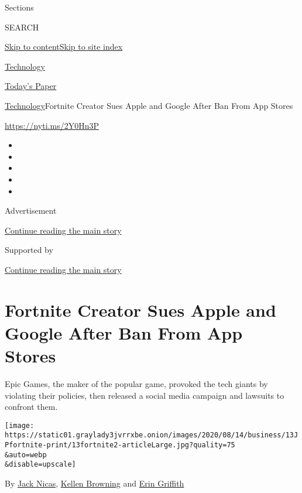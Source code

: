 Sections

SEARCH

\protect\hyperlink{site-content}{Skip to
content}\protect\hyperlink{site-index}{Skip to site index}

\href{https://www.nytimes3xbfgragh.onion/section/technology}{Technology}

\href{https://myaccount.nytimes3xbfgragh.onion/auth/login?response_type=cookie\&client_id=vi}{}

\href{https://www.nytimes3xbfgragh.onion/section/todayspaper}{Today's
Paper}

\href{/section/technology}{Technology}\textbar{}Fortnite Creator Sues
Apple and Google After Ban From App Stores

\url{https://nyti.ms/2Y0Hn3P}

\begin{itemize}
\item
\item
\item
\item
\item
\end{itemize}

Advertisement

\protect\hyperlink{after-top}{Continue reading the main story}

Supported by

\protect\hyperlink{after-sponsor}{Continue reading the main story}

\hypertarget{fortnite-creator-sues-apple-and-google-after-ban-from-app-stores}{%
\section{Fortnite Creator Sues Apple and Google After Ban From App
Stores}\label{fortnite-creator-sues-apple-and-google-after-ban-from-app-stores}}

Epic Games, the maker of the popular game, provoked the tech giants by
violating their policies, then released a social media campaign and
lawsuits to confront them.

\texttt{[image: https://static01.graylady3jvrrxbe.onion/images/2020/08/14/business/13JPfortnite-print/13fortnite2-articleLarge.jpg?quality=75\\\&auto=webp\\\&disable=upscale]}

By \href{https://www.nytimes3xbfgragh.onion/by/jack-nicas}{Jack Nicas},
\href{https://www.nytimes3xbfgragh.onion/by/kellen-browning}{Kellen
Browning} and
\href{https://www.nytimes3xbfgragh.onion/by/erin-griffith}{Erin
Griffith}


